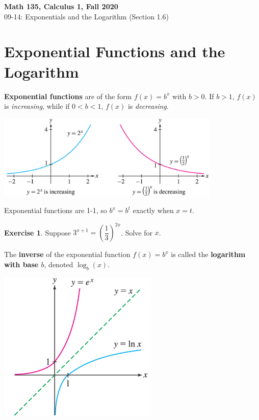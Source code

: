 \documentclass[11pt,reqno,final]{amsart}
\numberwithin{equation}{section}
\numberwithin{figure}{section}
\theoremstyle{definition} %
\newtheorem{exercise}[question]{Exercise}
\begin{document}
\begin{center}
        \textbf{\Large Math 135, Calculus 1, Fall 2020}\\[10pt]
        {\large 09-14: Exponentials and the Logarithm (Section 1.6)}
\end{center}

\thispagestyle{empty}

\renewcommand{\thesection}{\Alph{section}}

\section{Exponential Functions and the Logarithm}

\textbf{Exponential functions} are of the form $f(x) = b^x$ with $b > 0$.
If $b>1$, $f(x)$ is \textit{increasing}, while if $0<b<1$, $f(x)$ is \textit{decreasing}.
\begin{center}
        \includegraphics[width=0.8\textwidth]{exp_graphs.png}
\end{center}
Exponential functions are 1-1, so $b^x = b^t$ exactly when $x = t$.

\begin{exercise}
        Suppose $3^{x+1} = \left(\dfrac{1}{3}\right)^{2x}$. Solve for $x$.
        \vfill
\end{exercise}

The \textbf{inverse} of the exponential function $f(x) = b^x$ is called the \textbf{logarithm with base $b$}, denoted $\log_b(x)$.
\begin{center}
        \includegraphics[width=3in]{exp_log_inverse.png}
\end{center}
\end{document}

